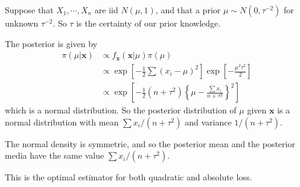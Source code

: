 \documentclass[a4paper]{article}
\begin{document}
\begin{eg}
  Suppose that $X_1, \cdots , X_n$ are iid $N(\mu, 1)$, and that a prior $\mu\sim N(0, \tau^{-2})$ for unknown $\tau^{-2}$. So $\tau$ is the certainty of our prior knowledge.

  The posterior is given by
  \begin{align*}
    \pi(\mu|\mathbf{x})&\propto f_\mathbf{x}(\mathbf{x}|\mu)\pi(\mu)\\
    &\propto \exp\left[-\frac{1}{2}\sum(x_i - \mu)^2\right]\exp\left[-\frac{\mu^2\tau^2}{2}\right]\\
    &\propto \exp\left[-\frac{1}{2}(n + \tau^2)\left\{\mu - \frac{\sum x_i}{n + \tau^2}\right\}^2\right]
  \end{align*}
  which is a normal distribution. So the posterior distribution of $\mu$ given $\mathbf{x}$ is a normal distribution with mean $\sum x_i/(n + \tau^2)$ and variance $1/(n + \tau^2)$.

  The normal density is symmetric, and so the posterior mean and the posterior media have the same value $\sum x_i/(n + \tau^2)$.

  This is the optimal estimator for both quadratic and absolute loss.
\end{eg}
\end{document}

